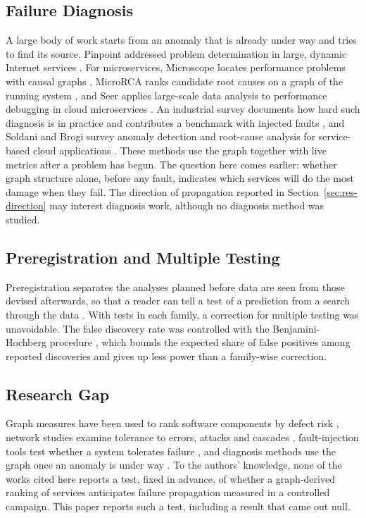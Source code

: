 \subsection{Failure Diagnosis}

A large body of work starts from an anomaly that is already under way and tries to find its
source. Pinpoint addressed problem determination in large, dynamic Internet services
\cite{chen2002}. For microservices, Microscope
locates performance problems with causal graphs \cite{lin2018}, MicroRCA ranks candidate root
causes on a graph of the running system \cite{wu2020}, and Seer applies large-scale data
analysis to performance debugging in cloud microservices \cite{gan2019seer}. An industrial
survey documents how hard such diagnosis is in practice and contributes a benchmark with
injected faults \cite{zhou2021}, and Soldani and Brogi survey anomaly detection and
root-cause analysis for service-based cloud applications \cite{soldani2022}. These methods use
the graph together with live metrics after a problem has begun. The question here comes
earlier: whether graph structure alone, before any fault, indicates which services will do the
most damage when they fail. The direction of propagation reported in
Section~\ref{sec:res-direction} may interest diagnosis work, although no diagnosis method was
studied.

\subsection{Preregistration and Multiple Testing}

Preregistration separates the analyses planned before data are seen from those devised
afterwards, so that a reader can tell a test of a prediction from a search through the data
\cite{nosek2018}. With  tests in each family, %
a correction for multiple testing was unavoidable. The false discovery rate was controlled
with the Benjamini-Hochberg procedure \cite{benjamini1995}, which bounds the expected share
of false positives among reported discoveries and gives up less power than a family-wise
correction.

\subsection{Research Gap}

Graph measures have been used to rank software components by defect risk
\cite{zimmermann2008}, network studies examine tolerance to errors, attacks and cascades
\cite{albert2000,motter2002}, fault-injection tools test whether a system tolerates
failure \cite{basiri2016,heorhiadi2016,meiklejohn2021}, and diagnosis methods use the graph
once an anomaly is under way \cite{wu2020,lin2018}. To the authors' knowledge, none of the
works cited here reports a test, fixed in advance, of whether a graph-derived ranking of
services anticipates failure propagation measured in a controlled campaign. This paper
reports such a test, including a result that came out null.
